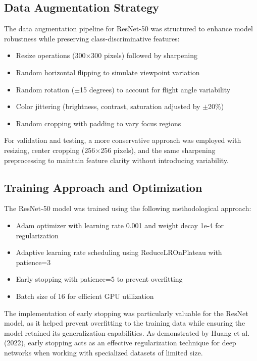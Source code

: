 \subsection{Data Augmentation Strategy}

The data augmentation pipeline for ResNet-50 was structured to enhance model robustness while preserving class-discriminative features:

\begin{itemize}
    \item Resize operations (300$\times$300 pixels) followed by sharpening
    \item Random horizontal flipping to simulate viewpoint variation
    \item Random rotation ($\pm$15 degrees) to account for flight angle variability
    \item Color jittering (brightness, contrast, saturation adjusted by $\pm$20\%)
    \item Random cropping with padding to vary focus regions
\end{itemize}

For validation and testing, a more conservative approach was employed with resizing, center cropping (256$\times$256 pixels), and the same sharpening preprocessing to maintain feature clarity without introducing variability\citep{jatit}.

\subsection{Training Approach and Optimization}

The ResNet-50 model was trained using the following methodological approach:

\begin{itemize}
    \item Adam optimizer with learning rate 0.001 and weight decay 1e-4 for regularization
    \item Adaptive learning rate scheduling using ReduceLROnPlateau with patience=3
    \item Early stopping with patience=5 to prevent overfitting
    \item Batch size of 16 for efficient GPU utilization
\end{itemize}

The implementation of early stopping was particularly valuable for the ResNet model, as it helped prevent overfitting to the training data while ensuring the model retained its generalization capabilities. As demonstrated by Huang et al. (2022), early stopping acts as an effective regularization technique for deep networks when working with specialized datasets of limited size\citep{mdpi}.

